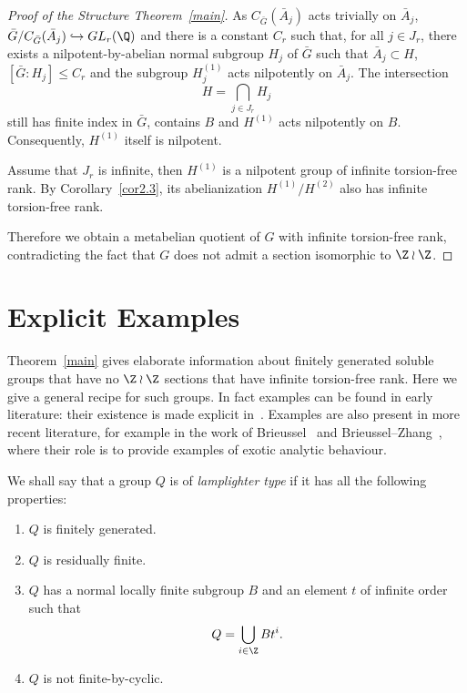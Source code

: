 \begin{proof}[{Proof of the Structure Theorem~\ref{main}}]
As $C_{\bar G}(\bar A_j)$ acts trivially on $\bar A_j$, $\bar G/C_{\bar G}(\bar A_j) \hookrightarrow GL_r(\Q)$ and there is a constant $C_r$ such that, for all $j\in J_r$, there exists a nilpotent-by-abelian normal subgroup $H_j$ of $\bar G$ such that $\bar A_j \subset H$, $[\bar G : H_j] \leq C_r$ and the subgroup $H_j^{(1)}$ acts nilpotently on $\bar A_j$. The intersection
\[
H = \bigcap_{j\in J_r} H_j
\]
still has finite index in $\bar G$, contains $B$ and $H^{(1)}$ acts nilpotently on $B$. Consequently, $H^{(1)}$ itself is nilpotent.


Assume that $J_r$ is infinite, then $H^{(1)}$ is a nilpotent group of infinite torsion-free rank. By Corollary~\ref{cor2.3}, its abelianization $H^{(1)} /H^{(2)}$ also has infinite torsion-free rank.

Therefore we obtain a metabelian quotient of $G$ with infinite torsion-free rank, contradicting the fact that $G$ does not admit a section isomorphic to $\Z\wr\Z$.
\end{proof}


\section{Explicit Examples}\label{sec-4}

Theorem~\ref{main} gives elaborate information about finitely generated soluble groups that have no $\Z\wr\Z$ sections that have infinite torsion-free rank. Here we give a general recipe for such groups. In fact examples can be found in early literature: their existence is made explicit in~\cite{K2}. Examples are also present in more recent literature, for example in the work of Brieussel~\cite{Brieussel} and Brieussel--Zhang~\cite{BZ}, where their role is to provide examples of exotic analytic behaviour.


\begin{defi*} We shall say that a group $Q$ is of \emph{lamplighter type} if it has all the following properties:
\begin{enumerate}\romanenumi
\item \label{list4.def.1}$Q$ is finitely generated.
\item \label{list4.def.2}$Q$ is residually finite.
\item \label{list4.def.3}$Q$ has a normal locally finite subgroup $B$ and an element $t$ of infinite order such that
\[
Q=\bigcup_{i\in\Z}Bt^i.
\]
\item \label{list4.def.4}$Q$ is not finite-by-cyclic.
\end{enumerate}
\end{defi*}



